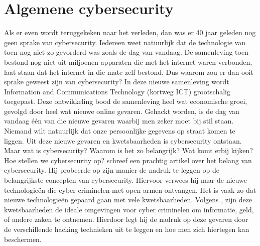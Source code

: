 \section{Algemene cybersecurity}
Als er even wordt teruggekeken naar het verleden, dan was er 40 jaar geleden nog geen sprake van cybersecurity. Iedereen weet natuurlijk dat de technologie van toen nog niet zo gevorderd was zoals de dag van vandaag. De samenleving toen bestond nog niet uit miljoenen apparaten die met het internet waren verbonden, laat staan dat het internet in die mate zelf bestond. Dus waarom zou er dan ooit sprake geweest zijn van cybersecurity?
\newline
\newline 
In deze nieuwe samenleving wordt Information and Communications Technology (kortweg ICT) grootschalig toegepast. Deze ontwikkeling bood de samenleving heel wat economische groei, gevolgd door heel wat nieuwe online gevaren. Gehackt worden, is de dag van vandaag één van die nieuwe gevaren waarbij men zeker moet bij stil staan. Niemand wilt natuurlijk dat onze persoonlijke gegevens op straat komen te liggen. Uit deze nieuwe gevaren en kwetsbaarheden is cybersecurity ontstaan. Maar wat is cybersecurity? Waarom is het zo belangrijk? Wat komt erbij kijken? Hoe stellen we cybersecurity op?
\newline
\newline
\cite{AlexTarter2017} schreef een prachtig artikel over het belang van cybersecurity. Hij probeerde op zijn manier de nadruk te leggen op de belangrijkste concepten van cybersecurity. Hiervoor verwees hij naar de nieuwe technologieën die cyber criminelen met open armen ontvangen. Het is vaak zo dat nieuwe technologieën gepaard gaan met vele kwetsbaarheden. Volgens \cite{AlexTarter2017}, zijn deze kwetsbaarheden de ideale omgevingen voor cyber criminelen om informatie, geld, of andere zaken te ontnemen. Hierdoor legt hij de nadruk op deze gevaren door de verschillende hacking technieken uit te leggen en hoe men zich hiertegen kan beschermen. 

